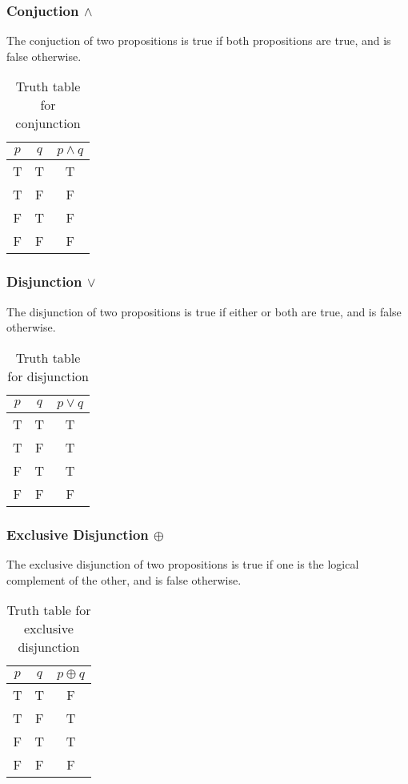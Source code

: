 \documentclass[twocolumn]{report}
\begin{document}
\subsubsection{Conjuction $\wedge$}
The conjuction of two propositions is true if both propositions are true, and is false otherwise.
\begin{table}[h]
	\centering
	\label{tab: conjunction-truth-table}
	\begin{tabular}{cc|c}
		$p$ & $q$ & $p\wedge q$ \\ \hline
		T & T & T \\
		T & F & F \\
		F & T & F \\
		F & F & F \\
	\end{tabular}
	\caption{Truth table for conjunction}
\end{table}

\subsubsection{Disjunction $\lor$}
The disjunction of two propositions is true if either or both are true, and is false otherwise.
\begin{table}[h]
	\centering
	\label{tab: disjunction-truth-table}
	\begin{tabular}{cc|c}
		$p$ & $q$ & $p\lor q$ \\ \hline
		T & T & T \\
		T & F & T \\
		F & T & T \\
		F & F & F \\
	\end{tabular}
	\caption{Truth table for disjunction}
\end{table}

\subsubsection{Exclusive Disjunction $\oplus$}
The exclusive disjunction of two propositions is true if one is the logical complement of the other, and is false otherwise. 
\begin{table}[h]
	\centering
	\label{tab: exclusive-disjuction-truth-table}
	\begin{tabular}{cc|c}
		$p$ & $q$ & $p\oplus q$ \\ \hline
		T & T & F \\
		T & F & T \\
		F & T & T \\
		F & F & F \\
	\end{tabular}
	\caption{Truth table for exclusive disjunction}
\end{table}
\end{document}
